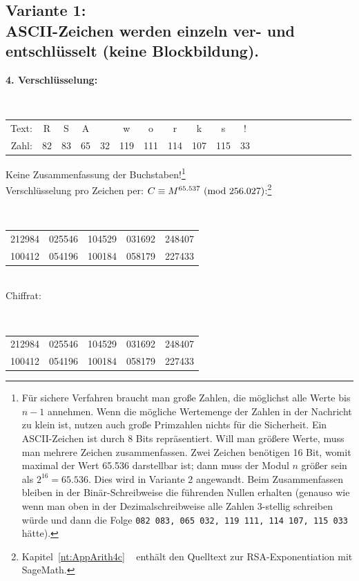 \begin{refsegment}
\subsection*{Variante 1:\\ ASCII-Zeichen werden einzeln ver- und entschlüsselt (keine Blockbildung).}

{\bf 4. Verschlüsselung:}\\
{\tt
\begin{tabular}{rcccccccccccccccccccc}
{\rm Text:} & R & S & A &   & w & o & r & k & s & !\\
{\rm Zahl:} & 82 & 83 & 65 & 32 & 119 & 111 & 114 & 107 & 115 & 33
\end{tabular} } %

\noindent Keine Zusammenfassung der Buchstaben!\footnote{%
Für sichere Verfahren braucht man große Zahlen, die möglichst alle Werte bis
$n-1$ annehmen. Wenn die mögliche Wertemenge der Zahlen in der Nachricht zu
klein ist, nutzen auch große Primzahlen nichts für die Sicherheit.
Ein ASCII-Zeichen ist durch $8$ Bits repräsentiert. Will man größere Werte,
muss man mehrere Zeichen zusammenfassen. Zwei Zeichen benötigen 16 Bit, womit
maximal der Wert 65.536 darstellbar ist; dann muss der Modul $n$ größer sein als
$2^{16} = 65.536$. Dies wird in Variante 2 angewandt.
Beim Zusammenfassen bleiben in der Binär-Schreibweise die führenden Nullen
erhalten (genauso wie wenn man oben in der Dezimalschreibweise alle Zahlen
3-stellig schreiben würde und dann die Folge {\tt 082 083, 065 032,
119 111, 114 107, 115 033} hätte).
}
\label{SrcArith4c}\\
Verschlüsselung pro Zeichen per: $C \equiv M^{65.537}{\rm ~(mod~}256.027)$:\footnote{%
  Kapitel~\ref{nt:AppArith4c} \glqq {}\grqq~
  enthält den Quelltext zur RSA-Exponentiation mit SageMath.
}\\
{\tt
\begin{tabular}{lllll}
212984 & 025546 & 104529 & 031692 & 248407\\
100412 & 054196 & 100184 & 058179 & 227433\\
\end{tabular}
}

\\
Chiffrat:\\
{\tt
\begin{tabular}{lllll}
212984 & 025546 & 104529 & 031692 & 248407\\
100412 & 054196 & 100184 & 058179 & 227433\\
\end{tabular} }


\end{refsegment}
